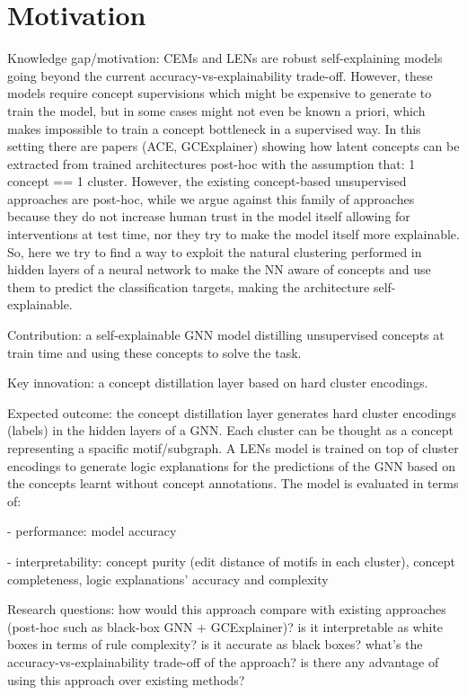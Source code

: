 \documentclass[withindex,glossary]{cam-thesis}
\theoremstyle{plain}
\theoremstyle{definition}
\theoremstyle{remark}
\begin{document}
\section{Motivation}
Knowledge gap/motivation: CEMs and LENs are robust self-explaining models going beyond the current accuracy-vs-explainability trade-off. However, these models require concept supervisions which might be expensive to generate to train the model, but in some cases might not even be known a priori, which makes impossible to train a concept bottleneck in a supervised way. In this setting there are papers (ACE, GCExplainer) showing how latent concepts can be extracted from trained architectures post-hoc with the assumption that: 1 concept == 1 cluster. However, the existing concept-based unsupervised approaches are post-hoc, while we argue against this family of approaches because they do not increase human trust in the model itself allowing for interventions at test time, nor they try to make the model itself more explainable. So, here we try to find a way to exploit the natural clustering performed in hidden layers of a neural network to make the NN aware of concepts and use them to predict the classification targets, making the architecture self-explainable.

Contribution: a self-explainable GNN model distilling unsupervised concepts at train time and using these concepts to solve the task.

Key innovation: a concept distillation layer based on hard cluster encodings.

Expected outcome: the concept distillation layer generates hard cluster encodings (labels) in the hidden layers of a GNN. Each cluster can be thought as a concept representing a spacific motif/subgraph. A LENs model is trained on top of cluster encodings to generate logic explanations for the predictions of the GNN based on the concepts learnt without concept annotations. The model is evaluated in terms of:

- performance: model accuracy

- interpretability: concept purity (edit distance of motifs in each cluster), concept completeness, logic explanations' accuracy and complexity

Research questions: how would this approach compare with existing approaches (post-hoc such as black-box GNN + GCExplainer)? is it interpretable as white boxes in terms of rule complexity? is it accurate as black boxes? what's the accuracy-vs-explainability trade-off of the approach? is there any advantage of using this approach over existing methods?
\end{document}
